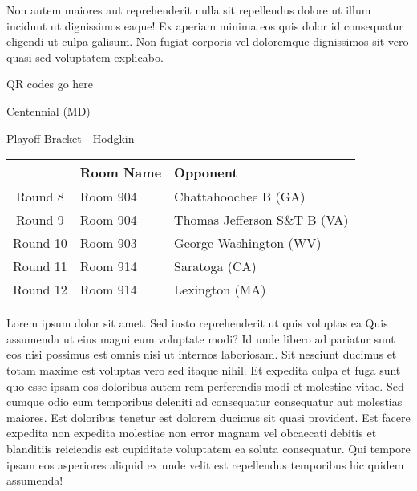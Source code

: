 \documentclass{article}%
\begin{document}
\newline%
Non autem maiores aut reprehenderit nulla sit repellendus dolore ut illum incidunt ut dignissimos eaque! Ex aperiam minima eos quis dolor id consequatur eligendi ut culpa galisum. Non fugiat corporis vel doloremque dignissimos sit vero quasi sed voluptatem explicabo.\newline%
\newline%
%
\vspace*{30pt}%
\begin{center}%
\begin{Huge}%
QR codes go here%
\end{Huge}%
\end{center}%
\newpage%
\begin{center}%
\begin{Huge}%
Centennial (MD)%
\end{Huge}%
\vspace*{8pt}%
\linebreak%
\begin{Large}%
Playoff Bracket {-} Hodgkin%
\end{Large}%
\end{center}%
\begin{tabularx}{\textwidth}{|c|Y|Y|}%
\hline%
&Room Name&Opponent\\%
\hline%
Round 8&Room 904&Chattahoochee B (GA)\\%
Round 9&Room 904&Thomas Jefferson S\&T B (VA)\\%
Round 10&Room 903&George Washington (WV)\\%
Round 11&Room 914&Saratoga (CA)\\%
Round 12&Room 914&Lexington (MA)\\%
\hline%
\end{tabularx}%
\vspace*{8pt}%
\linebreak%
\newline%
\newline%
Lorem ipsum dolor sit amet. Sed iusto reprehenderit ut quis voluptas ea Quis assumenda ut eius magni eum voluptate modi? Id unde libero ad pariatur sunt eos nisi possimus est omnis nisi ut internos laboriosam. Sit nesciunt ducimus et totam maxime est voluptas vero sed itaque nihil. Et expedita culpa et fuga sunt quo esse ipsam eos doloribus autem rem perferendis modi et molestiae vitae.\newline%
\newline%
Sed cumque odio eum temporibus deleniti ad consequatur consequatur aut molestias maiores. Est doloribus tenetur est dolorem ducimus sit quasi provident. Est facere expedita non expedita molestiae non error magnam vel obcaecati debitis et blanditiis reiciendis est cupiditate voluptatem ea soluta consequatur. Qui tempore ipsam eos asperiores aliquid ex unde velit est repellendus temporibus hic quidem assumenda!\newline%
\end{document}
